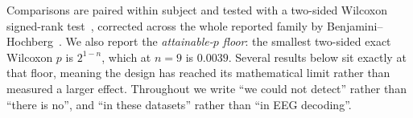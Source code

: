 Comparisons are paired within subject and tested with a two-sided Wilcoxon
signed-rank test~\cite{wilcoxon1945individual}, corrected across the whole
reported family by Benjamini--Hochberg~\cite{benjamini1995fdr}. We also report
the \emph{attainable-$p$ floor}: the smallest two-sided exact Wilcoxon $p$ is
$2^{1-n}$, which at $n=9$ is $0.0039$. Several results below sit exactly at
that floor, meaning the design has reached its mathematical limit rather than
measured a larger effect. Throughout we write ``we could not detect'' rather
than ``there is no'', and ``in these datasets'' rather than ``in EEG
decoding''.
